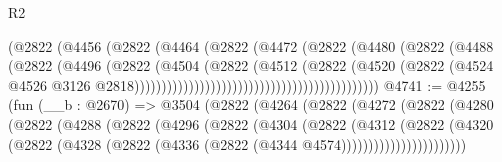 \begin{lexlean}{R2}
\begin{coremodule}
                                                      (@2822
                                                        (@4456
                                                          (@2822
                                                            (@4464
                                                              (@2822
                                                                (@4472
                                                                  (@2822
                                                                    (@4480
                                                                      (@2822
                                                                        (@4488
                                                                          (@2822
                                                                            (@4496
                                                                              (@2822
                                                                                (@4504
                                                                                  (@2822
                                                                                    (@4512
                                                                                      (@2822
                                                                                        (@4520
                                                                                          (@2822
                                                                                            (@4524
                                                                                              @4526
                                                                                              @3126
                                                                                              @2818)))))))))))))))))))))))))))))))))))))))))))))
@4741 := @4255
    (fun (__b : @2670) =>
    @3504
      (@2822
        (@4264
          (@2822
            (@4272
              (@2822
                (@4280
                  (@2822
                    (@4288
                      (@2822
                        (@4296
                          (@2822
                            (@4304
                              (@2822
                                (@4312
                                  (@2822
                                    (@4320
                                      (@2822
                                        (@4328
                                          (@2822 (@4336 (@2822 (@4344 @4574)))))))))))))))))))))))

\end{coremodule}
\end{lexlean}
